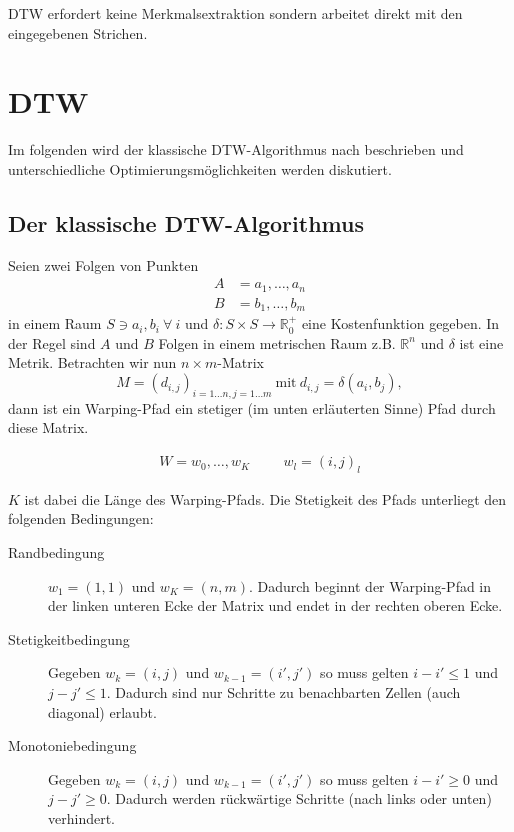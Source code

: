 DTW erfordert keine Merkmalsextraktion sondern arbeitet direkt mit den eingegebenen Strichen.

\section{DTW} %
\label{sec:dtw}

Im folgenden wird der klassische DTW-Algorithmus nach \citet{Tappert:1982p10305} beschrieben und unterschiedliche Optimierungsmöglichkeiten werden diskutiert.

\subsection{Der klassische DTW-Algorithmus} %
\label{sub:dtw}

Seien zwei Folgen von Punkten
\begin{align}
  \label{eqn:a}
  A &= a_1, \dots, a_n \\
  \label{eqn:b}
  B &= b_1, \dots, b_m
\end{align}
in einem Raum \( S \ni a_i, b_i ~\forall~i \) und %
\( \delta : S\times S \rightarrow \mathbb{R}_0^+ \) eine Kostenfunktion
gegeben. In der Regel sind \(A\) und \(B\) Folgen in einem metrischen Raum z.B. \(\mathbb{R}^n\) und \(\delta\) ist eine Metrik.
Betrachten wir nun \( n\times m\)-Matrix
\begin{equation} \label{eqn:matrix}
  M = (d_{i,j})_{i=1\dots n, j=1\dots m} ~\text{mit}~ d_{i,j} = \delta(a_i,b_j) ,
\end{equation}
dann ist ein Warping-Pfad ein stetiger (im unten erläuterten Sinne) Pfad durch diese Matrix.

\begin{align}
  W = w_0,\dots,w_K \hspace{1cm} w_l = (i,j)_l
\end{align}

$K$ ist dabei die Länge des Warping-Pfads. Die Stetigkeit des Pfads unterliegt den folgenden Bedingungen:

\begin{description}
  \item[Randbedingung] \( w_1 = (1,1) \) und \( w_K = (n,m) \). Dadurch beginnt der Warping-Pfad in der linken unteren Ecke der Matrix und endet in der rechten oberen Ecke.
  \item[Stetigkeitbedingung] Gegeben \( w_k = (i,j) \) und \( w_{k-1} = (i',j') \) so muss gelten \( i-i' \leqslant 1 \) und \( j-j' \leqslant 1 \). Dadurch sind nur Schritte zu benachbarten Zellen (auch diagonal) erlaubt.
  \item[Monotoniebedingung] Gegeben \( w_k = (i,j) \) und \( w_{k-1} = (i',j') \) so muss gelten \( i-i' \geqslant 0 \) und \( j-j' \geqslant 0 \). Dadurch werden rückwärtige Schritte (nach links oder unten) verhindert.
\end{description}

